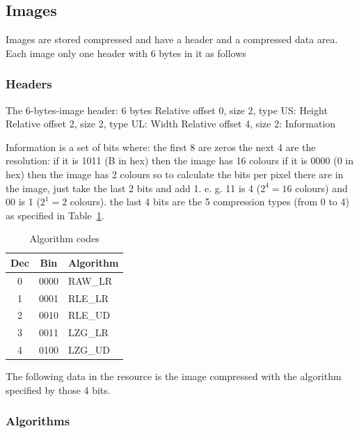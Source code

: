 \documentclass{article}
\begin{document}
\subsection{Images}
 Images are stored compressed and have a header and a compressed data area.
 Each image only one header with 6 bytes in it as follows

\subsubsection{Headers} %
 The 6-bytes-image header: 6 bytes
  Relative offset 0, size 2, type US: Height
  Relative offset 2, size 2, type UL: Width
  Relative offset 4, size 2: Information

 Information is a set of bits where:
  the first 8 are zeros
  the next 4 are the resolution:
   if it is 1011 (B in hex) then the image has 16 colours
   if it is 0000 (0 in hex) then the image has 2 colours
   so to calculate the bits per pixel there are in the image, just take the
   last 2 bits and add 1. e. g. 11 is 4 ($2^4=16$ colours) and 00 is 1 ($2^1=2$ colours).
  the last 4 bits are the 5 compression types (from 0 to 4) as specified in Table~\ref{algorithm codes}.

\begin{center}
\begin{table}
\begin{tabular}{ccl}
\hline
Dec & Bin & Algorithm \\
\hline
0 & 0000 & RAW\_LR \\
1 & 0001 & RLE\_LR \\
2 & 0010 & RLE\_UD \\
3 & 0011 & LZG\_LR \\
4 & 0100 & LZG\_UD \\
\hline
\end{tabular}
\caption{Algorithm codes}
\label{algorithm codes}
\end{table}
\end{center}

 The following data in the resource is the image compressed with the
 algorithm specified by those 4 bits.

\subsubsection{Algorithms} %
\end{document}
